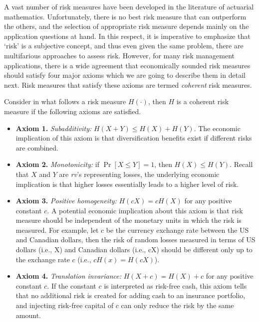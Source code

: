 \documentclass[]{book}
\providecommand{\tightlist}{%
  \setlength{\itemsep}{0pt}\setlength{\parskip}{0pt}}
\theoremstyle{definition}
\theoremstyle{definition}
\theoremstyle{definition}
\theoremstyle{remark}
\begin{document}
A vast number of risk measures have been developed in the literature of
actuarial mathematics. Unfortunately, there is no best risk measure that
can outperform the others, and the selection of appropriate risk measure
depends mainly on the application questions at hand. In this respect, it
is imperative to emphasize that `risk' is a subjective concept, and thus
even given the same problem, there are multifarious approaches to assess
risk. However, for many risk management applications, there is a wide
agreement that economically sounded risk measures should satisfy four
major axioms which we are going to describe them in detail next. Risk
measures that satisfy these axioms are termed \emph{coherent} risk
measures.

Consider in what follows a risk measure \(H(\cdot)\), then \(H\) is a
coherent risk measure if the following axioms are satisfied.

\begin{itemize}
\tightlist
\item
  \textbf{Axiom 1.} \emph{Subadditivity:} \(H(X+Y)\leq H(X)+H(Y)\). The
  economic implication of this axiom is that diversification benefits
  exist if different risks are combined.\\
\item
  \textbf{Axiom 2.} \emph{Monotonicity:} if \(\Pr[X\leq Y]=1\), then
  \(H(X)\leq H(Y)\). Recall that \(X\) and \(Y\) are \emph{rv}'s
  representing losses, the underlying economic implication is that
  higher losses essentially leads to a higher level of risk.\\
\item
  \textbf{Axiom 3.} \emph{Positive homogeneity:} \(H(cX)=cH(X)\) for any
  positive constant \(c\). A potential economic implication about this
  axiom is that risk measure should be independent of the monetary units
  in which the risk is measured. For example, let \(c\) be the currency
  exchange rate between the US and Canadian dollars, then the risk of
  random losses measured in terms of US dollars (i.e., X) and Canadian
  dollars (i.e., cX) should be different only up to the exchange rate
  \(c\) (i.e., \(cH(x)=H(cX)\)).\\
\item
  \textbf{Axiom 4.} \emph{Translation invariance:} \(H(X+c)=H(X)+c\) for
  any positive constant \(c\). If the constant \(c\) is interpreted as
  risk-free cash, this axiom tells that no additional risk is created
  for adding cash to an insurance portfolio, and injecting risk-free
  capital of \(c\) can only reduce the risk by the same amount.
\end{itemize}
\end{document}

